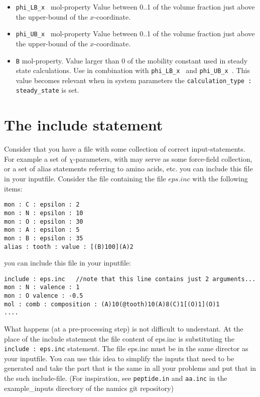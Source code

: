 \documentclass{article}
\begin{document}
\begin{itemize}
\item {\tt phi\_LB\_x } mol-property Value between 0..1  of the volume fraction just above the upper-bound of the $x$-coordinate.
\item {\tt phi\_UB\_x } mol-property Value between 0..1  of the volume fraction just above the upper-bound of the $x$-coordinate.
\item {\tt B} mol-property. Value larger than 0 of the mobility constant used in steady state calculations. Use in combination with {\tt phi\_LB\_x } and {\tt phi\_UB\_x }. This value becomes relevant when in system parameters the {\tt calculation\_type : steady\_state} is set.
\end{itemize}

\section{The include statement}
Consider that you have a file with some collection of correct input-statements. For example a set of $\chi$-parameters, with may serve as some force-field collection, or a set of alias statements referring to amino acids, etc. you can include this file in your inputfile. Consider the file containing the file $eps.inc$ with the following items: 

\begin{verbatim}
mon : C : epsilon : 2
mon : N : epsilon : 10
mon : O : epsilon : 30
mon : A : epsilon : 5
mon : B : epsilon : 35
alias : tooth : value : [(B)100](A)2
\end{verbatim}

you can include this file in your inputfile:

\begin{verbatim}
include : eps.inc   //note that this line contains just 2 arguments...
mon : N : valence : 1
mon : O valence : -0.5
mol : comb : composition : (A)10(@tooth)10(A)8(C)1[(O)1](O)1
....
\end{verbatim}

What happens (at a pre-processing step) is not difficult to understant. At the place of the include statement the file content of eps.inc is substituting the {\tt include : eps.inc} statement. The file eps.inc must be in the same director as your inputfile.  You can use this idea to simplify the inputs that need to be generated and take the part that is the same in all your problems and put that in the such include-file. (For inspiration, see {\tt peptide.in} and {\tt aa.inc} in the example\_inputs directory of the namics git repository)
\end{document}
